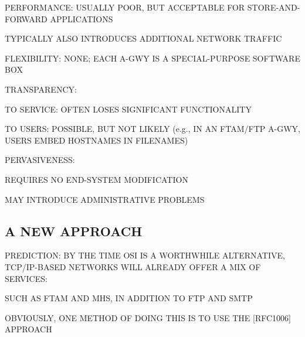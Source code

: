 \begin{bwslide}

\begin{nrtc}
\item	PERFORMANCE: USUALLY POOR, BUT ACCEPTABLE FOR STORE-AND-FORWARD
	APPLICATIONS
    \begin{nrtc}
    \item	TYPICALLY ALSO INTRODUCES ADDITIONAL NETWORK TRAFFIC
    \end{nrtc}

\item	FLEXIBILITY: NONE; EACH A-GWY IS A SPECIAL-PURPOSE SOFTWARE BOX

\item	TRANSPARENCY: 
    \begin{nrtc}
    \item	TO SERVICE: OFTEN LOSES SIGNIFICANT FUNCTIONALITY

    \item	TO USERS: POSSIBLE, BUT NOT LIKELY (e.g., IN AN FTAM/FTP A-GWY,
		USERS EMBED HOSTNAMES IN FILENAMES)
    \end{nrtc}

\item	PERVASIVENESS:
    \begin{nrtc}
    \item	REQUIRES NO END-SYSTEM MODIFICATION

    \item	MAY INTRODUCE ADMINISTRATIVE PROBLEMS
    \end{nrtc}
\end{nrtc}
\end{bwslide}


\begin{bwslide}
\part*	{A NEW APPROACH}\bf

\begin{nrtc}
\item	PREDICTION: BY THE TIME OSI IS A WORTHWHILE ALTERNATIVE,
	TCP/IP-BASED NETWORKS WILL ALREADY OFFER A MIX OF SERVICES:
    \begin{nrtc}
    \item	SUCH AS FTAM AND MHS, IN ADDITION TO FTP AND SMTP
    \end{nrtc}

\item	OBVIOUSLY, ONE METHOD OF DOING THIS IS TO USE THE [RFC1006] APPROACH
\end{nrtc}
\end{bwslide}


